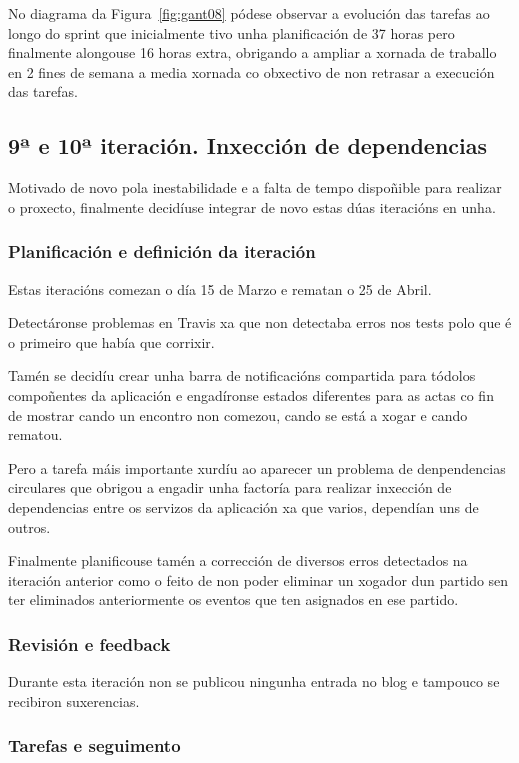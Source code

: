         No diagrama da Figura~\ref{fig:gant08} pódese observar a evolución das 
tarefas ao longo do sprint que inicialmente tivo unha planificación de 37 horas 
pero finalmente alongouse 16 horas extra, obrigando a ampliar a xornada de 
traballo en 2 fines de semana a media xornada co obxectivo de non retrasar a 
execución das tarefas.

    \subsection{9ª e 10ª iteración. Inxección de dependencias}
    Motivado de novo pola inestabilidade e a falta de tempo dispoñible para 
realizar o proxecto, finalmente decidíuse integrar de novo estas dúas iteracións 
en unha.

      \subsubsection{Planificación e definición da iteración}
      Estas iteracións comezan o día 15 de Marzo e rematan o 25 de Abril.

      Detectáronse problemas en Travis xa que non detectaba erros nos tests 
polo que é o primeiro que había que corrixir.

      Tamén se decidíu crear unha barra de notificacións compartida para 
tódolos compoñentes da aplicación e engadíronse estados diferentes para as 
actas co fin de mostrar cando un encontro non comezou, cando se está a xogar e 
cando rematou.

      Pero a tarefa máis importante xurdíu ao aparecer un problema de 
denpendencias circulares que obrigou a engadir unha factoría para realizar 
inxección de dependencias entre os servizos da aplicación xa que varios, 
dependían uns de outros.

      Finalmente planificouse tamén a corrección de diversos erros detectados 
na iteración anterior como o feito de non poder eliminar un xogador dun partido 
sen ter eliminados anteriormente os eventos que ten asignados en ese partido.

      \subsubsection{Revisión e feedback}
      Durante esta iteración non se publicou ningunha entrada no blog e 
tampouco se recibiron suxerencias.

      \subsubsection{Tarefas e seguimento}

